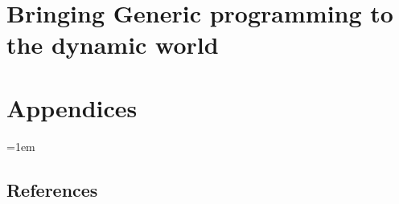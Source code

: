 \documentclass[11pt,a4paper]{book}
\begin{document}


\cleardoublepage


\part{Bringing Generic programming to the dynamic world}
\label{part:dynamic.world}



\cleardoublepage



\cleardoublepage


\part{Appendices}
\label{part:annexes}

\appendix

\emergencystretch=1em

\chapter{References}
\label{chap:bibliography}

\printbibliography[category=cited,heading=bibintoc]


\cleardoublepage




\end{document}
